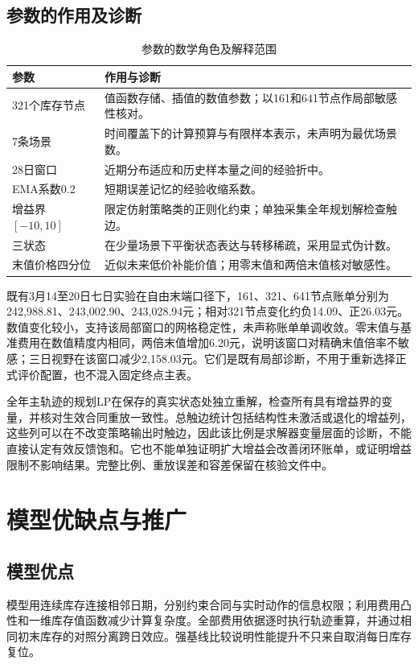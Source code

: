 \documentclass[UTF8,a4paper,zihao=-4,fontset=mac]{ctexart}
\begin{document}
\subsection{参数的作用及诊断}
\begin{table}[htbp]\centering\small
\caption{参数的数学角色及解释范围}
\begin{tabular}{lp{10.2cm}}\toprule
参数 & 作用与诊断 \\ \midrule
321个库存节点 & 值函数存储、插值的数值参数；以161和641节点作局部敏感性核对。 \\
7条场景 & 时间覆盖下的计算预算与有限样本表示，未声明为最优场景数。 \\
28日窗口 & 近期分布适应和历史样本量之间的经验折中。 \\
EMA系数0.2 & 短期误差记忆的经验收缩系数。 \\
增益界$[-10,10]$ & 限定仿射策略类的正则化约束；单独采集全年规划解检查触边。 \\
三状态 & 在少量场景下平衡状态表达与转移稀疏，采用显式伪计数。 \\
末值价格四分位 & 近似未来低价补能价值；用零末值和两倍末值核对敏感性。 \\
\bottomrule\end{tabular}\end{table}
既有3月14至20日七日实验在自由末端口径下，161、321、641节点账单分别为242,988.81、243,002.90、243,028.94元；相对321节点变化约负14.09、正26.03元。数值变化较小，支持该局部窗口的网格稳定性，未声称账单单调收敛。零末值与基准费用在数值精度内相同，两倍末值增加6.20元，说明该窗口对精确末值倍率不敏感；三日视野在该窗口减少2,158.03元。它们是既有局部诊断，不用于重新选择正式评价配置，也不混入固定终点主表。


全年主轨迹的规划LP在保存的真实状态处独立重解，检查所有具有增益界的变量，并核对生效合同重放一致性。总触边统计包括结构性未激活或退化的增益列，这些列可以在不改变策略输出时触边，因此该比例是求解器变量层面的诊断，不能直接认定有效反馈饱和。它也不能单独证明扩大增益会改善闭环账单，或证明增益限制不影响结果。完整比例、重放误差和容差保留在核验文件中。

\section{模型优缺点与推广}
\subsection{模型优点}
模型用连续库存连接相邻日期，分别约束合同与实时动作的信息权限；利用费用凸性和一维库存值函数减少计算复杂度。全部费用依据逐时执行轨迹重算，并通过相同初末库存的对照分离跨日效应。强基线比较说明性能提升不只来自取消每日库存复位。
\end{document}
